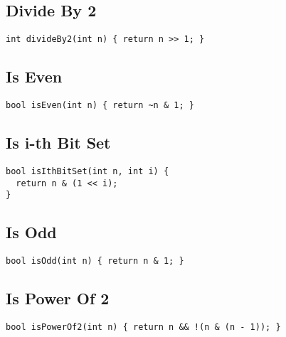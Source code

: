 \documentclass[twoside]{article}
\newcommand{\fileTitleStyle}{\large\underline}
\begin{document}
\begin{multicols*}{2}
\subsectionfont{\centering\bfseries\LARGE}
\subsectionfont{\fileTitleStyle}
\subsection*{Divide By 2}
\begin{verbatim}
int divideBy2(int n) { return n >> 1; }
\end{verbatim}

\subsectionfont{\centering\bfseries\LARGE}
\subsectionfont{\fileTitleStyle}
\subsection*{Is Even}
\begin{verbatim}
bool isEven(int n) { return ~n & 1; }
\end{verbatim}

\subsectionfont{\centering\bfseries\LARGE}
\subsectionfont{\fileTitleStyle}
\subsection*{Is i-th Bit Set}
\begin{verbatim}
bool isIthBitSet(int n, int i) {
  return n & (1 << i);
}
\end{verbatim}

\subsectionfont{\centering\bfseries\LARGE}
\subsectionfont{\fileTitleStyle}
\subsection*{Is Odd}
\begin{verbatim}
bool isOdd(int n) { return n & 1; }
\end{verbatim}

\subsectionfont{\centering\bfseries\LARGE}
\subsectionfont{\fileTitleStyle}
\subsection*{Is Power Of 2}
\begin{verbatim}
bool isPowerOf2(int n) { return n && !(n & (n - 1)); }
\end{verbatim}


\end{multicols*}
\end{document}
